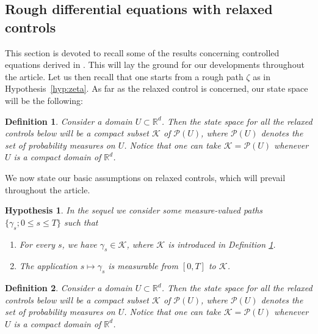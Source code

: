 \documentclass[10pt,a4paper]{amsart}
\newtheorem{hypothesis}{Hypothesis}
\newtheorem{definition}{Definition}
\newcommand{\R}{\mathbb R}
\newcommand{\bzeta}{{\zeta}}
\newcommand{\ck}{\mathcal K}
\newcommand{\cp}{\mathcal P}
\newcommand{\cv}{\mathcal V}
\newcommand{\ga}{\gamma}
\begin{document}
\subsection{Rough differential equations with relaxed controls}
This section is devoted to recall some of the results concerning controlled equations derived in \cite{CHT}. This will lay the ground for our developments throughout the article. Let us then recall that one starts from a rough path $\bzeta$ as in Hypothesis~\ref{hyp:zeta}. 
As far as the relaxed control is concerned, our state space will be the following:
\begin{definition}\label{def:rel-control}
Consider a domain $U \subset \R^d$. Then the state space for all the relaxed controls below will be a compact subset $\ck$ of $\cp(U)$, where $\cp(U)$ denotes the set of probability measures on $U$. Notice that one can take $\ck = \cp(U)$ whenever $U$ is a compact domain of $\R^d$.
\end{definition}
We now state our basic assumptions on relaxed controls, which will prevail throughout the article.
\begin{hypothesis}\label{hyp:rel-control-1}
In the sequel we consider some measure-valued paths $\{ \ga_s; 0 \leq s \leq T \}$ such that
\begin{enumerate}[wide, labelwidth=!, labelindent=0pt, label=\textnormal{(\arabic*)}]
\setlength\itemsep{.05in}
\item For every $s$, we have $\gamma_{s}\in \mathcal{K}$, where $\mathcal{K}$ is introduced in Definition \ref{def:rel-control}.
\item The application $s\mapsto \gamma_{s}$ is measurable from $[0,T]$ to $\mathcal{K}$.
\end{enumerate}
\end{hypothesis}

\begin{definition}
Consider a domain $U \subset \R^d$. Then the state space for all the relaxed controls below will be a compact subset $\ck$ of $\cp(U)$, where $\cp(U)$ denotes the set of probability measures on $U$. Notice that one can take $\ck = \cp(U)$ whenever $U$ is a compact domain of $\R^d$.
\end{definition}
\end{document}
